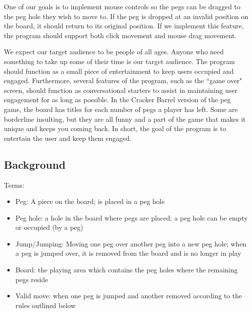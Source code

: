 \documentclass[10pt,conference,onecolumn,compsoc]{IEEEtran}
\begin{document}
One of our goals is to implement mouse controls so the pegs can be dragged to the peg hole they wish to move to. If the peg is dropped at an invalid position on the board, it should return to its original position. If we implement this feature, the program should support both click movement and mouse drag movement.

We expect our target audience to be people of all ages. Anyone who need something to take up some of their time is our target audience. The program should function as a small piece of entertainment to keep users occupied and engaged. Furthermore, several features of the program, such as the ``game over" screen, should function as conversational starters to assist in maintaining user engagement for as long as possible. In the Cracker Barrel version of the peg game, the board has titles for each number of pegs a player has left. Some are borderline insulting, but they are all funny and a part of the game that makes it unique and keeps you coming back. In short, the goal of the program is to entertain the user and keep them engaged.

\subsection{Background}

Terms:
\begin{itemize}
\item Peg: A piece on the board; is placed in a peg hole
\item Peg hole: a hole in the board where pegs are placed; a peg hole can be empty or occupied (by a peg)
\item Jump/Jumping: Moving one peg over another peg into a new peg hole; when a peg is jumped over, it is removed from the board and is no longer in play
\item Board: the playing area which contains the peg holes where the remaining pegs reside
\item Valid move: when one peg is jumped and another removed according to the rules outlined below
\end{itemize}
\end{document}
